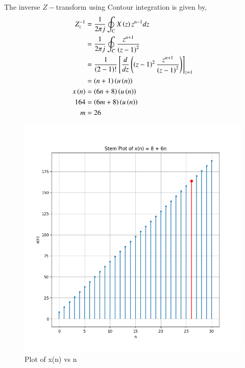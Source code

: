 \documentclass[journal,12pt,twocolumn]{IEEEtran}
\begin{document}
The inverse $Z-$transform using Contour integration is given by,
\begin{align}
    Z_z^{-1} &= \frac{1}{2\pi j}\oint_C X\left(z\right)z^{n-1}dz\\
    &= \frac{1}{2\pi j}\oint_C \frac{z^{n+1}}{\left(z-1\right)^2}\\
    &= \frac{1}{\left(2-1\right)!}\left[ \frac{d}{dz}\left(\left(z-1\right)^2 \frac{z^{n+1}}{\left(z-1\right)^2}\right) \right]_{z=1}\\
    &= \left(n+1\right)\left(u\left(n\right)\right)\\
    x\left(n\right) &= \left(6n+8\right)\left(u\left(n\right)\right)\\
    164 &= \left(6m+8\right)\left(u\left(n\right)\right)\\
    m &= 26
\end{align}




\begin{figure}[htbp]
    \centering
    \includegraphics[width=1.0\columnwidth]{figs/Figure_1.png}
    \caption{Plot of x(n) vs n}
    \label{fig:11.9.2.13.1}
\end{figure}

%
\end{document}
